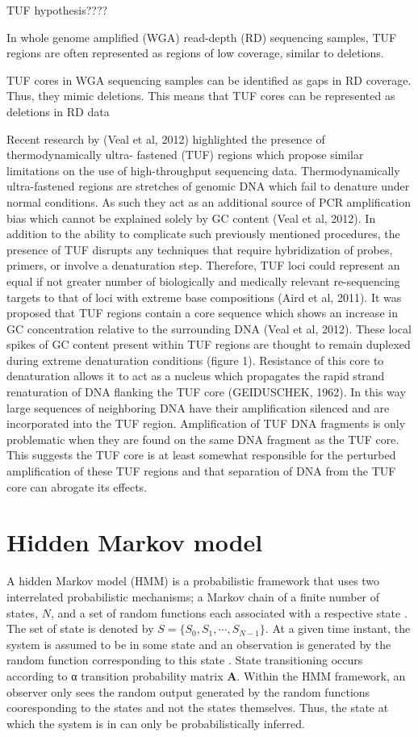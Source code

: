 TUF hypothesis????

In whole genome amplified (WGA) read-depth
(RD) sequencing samples, TUF regions are often represented as regions of low coverage,
similar to deletions.

TUF cores in WGA sequencing samples can be identified as gaps in RD coverage. Thus, they
mimic deletions. This means that TUF cores can be represented as deletions in RD data

Recent research by (Veal et al, 2012) highlighted the presence of thermodynamically ultra-
fastened (TUF) regions which propose similar limitations on the use of high-throughput
sequencing data. Thermodynamically ultra-fastened regions are stretches of genomic DNA
which fail to denature under normal conditions. As such they act as an additional source of
PCR amplification bias which cannot be explained solely by GC content (Veal et al, 2012). In
addition to the ability to complicate such previously mentioned procedures, the presence of
TUF disrupts any techniques that require hybridization of probes, primers, or involve a
denaturation step. Therefore, TUF loci could represent an equal if not greater number of
biologically and medically relevant re-sequencing targets to that of loci with extreme base
compositions (Aird et al, 2011).
It was proposed that TUF regions contain a core sequence which shows an increase in GC
concentration relative to the surrounding DNA (Veal et al, 2012). These local spikes of GC
content present within TUF regions are thought to remain duplexed during extreme
denaturation conditions (figure 1). Resistance of this core to denaturation allows it to act as
a nucleus which propagates the rapid strand renaturation of DNA flanking the TUF core
(GEIDUSCHEK, 1962). In this way large sequences of neighboring DNA have their
amplification silenced and are incorporated into the TUF region. Amplification of TUF DNA
fragments is only problematic when they are found on the same DNA fragment as the TUF
core. This suggests the TUF core is at least somewhat responsible for the perturbed
amplification of these TUF regions and that separation of DNA from the TUF core can
abrogate its effects.

\section{Hidden Markov model}
\label{hmm_general}

A hidden Markov model (HMM) is a probabilistic framework that uses two interrelated probabilistic mechanisms; a Markov chain of a finite
number of states, $N$, and a set of random functions each associated with a respective state \cite{koski}.  The set of state is denoted by $S=\{S_0, S_1,\cdots, S_{N-1}\}$. At a given time instant, the 
system is assumed to be in some state and an observation is generated by the random function corresponding to this state  \cite{koski}.
State transitioning occurs according to α transition probability matrix  $\mathbf{A}$. Within  the HMM framework, an observer only sees the random output generated by the random functions cooresponding to the states and not the states themselves. Thus, the state at which the system is in can only be probabilistically inferred. 

